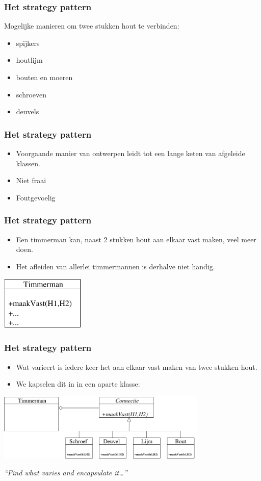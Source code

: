 \documentclass{beamer}
\begin{document}
\begin{frame}
\frametitle{Het strategy pattern}
Mogelijke manieren om twee stukken hout te verbinden:
\begin{itemize}
\item spijkers
\item houtlijm
\item bouten en moeren
\item schroeven
\item deuvels
\end{itemize}
\end{frame}

\begin{frame}
\frametitle{Het strategy pattern}
\begin{itemize}
\item Voorgaande manier van ontwerpen leidt tot een lange keten van afgeleide klassen.
\item Niet fraai
\item Foutgevoelig
\end{itemize}
\end{frame}

\begin{frame}
\frametitle{Het strategy pattern}
\begin{itemize}
\item Een timmerman kan, naast 2 stukken hout aan elkaar vast maken, veel meer doen.
\item Het afleiden van allerlei timmermannen is derhalve niet handig.
\end{itemize}
\begin{center}
\includegraphics[width=4cm]{timmer4}
\end{center}
\end{frame}

\begin{frame}
\frametitle{Het strategy pattern}
\begin{itemize}
\item Wat varieert is iedere keer het aan elkaar vast maken van twee stukken hout.
\item We kapselen dit in in een aparte klasse:
\end{itemize}
\begin{center}
\includegraphics[width=10cm]{timmer5}
\end{center}
\emph{``Find what varies and encapsulate it\ldots''}
\end{frame}
\end{document}
